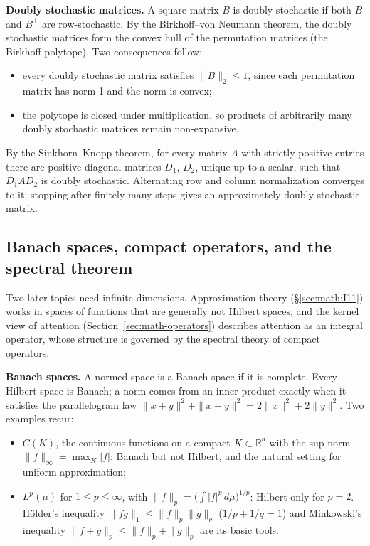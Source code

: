 \textbf{Doubly stochastic matrices.} A square matrix \(B\) is doubly
stochastic if both \(B\) and \(B^{\top}\) are row-stochastic. By the
Birkhoff--von Neumann theorem, the doubly stochastic matrices form the
convex hull of the permutation matrices (the Birkhoff polytope). Two
consequences follow:

\begin{itemize}
\tightlist
\item
  every doubly stochastic matrix satisfies \(\|B\|_{2} \le 1\), since each
  permutation matrix has norm 1 and the norm is convex;
\item
  the polytope is closed under multiplication, so products of
  arbitrarily many doubly stochastic matrices remain non-expansive.
\end{itemize}

By the Sinkhorn--Knopp theorem, for every matrix \(A\) with strictly
positive entries there are positive diagonal matrices \(D_{1}\),
\(D_{2}\), unique up to a scalar, such that \(D_{1}AD_{2}\) is
doubly stochastic. Alternating row and column normalization converges to
it; stopping after finitely many steps gives an approximately doubly
stochastic matrix.

\subsection{Banach spaces, compact operators, and the spectral
theorem}\label{sec:math:I4}

Two later topics need infinite dimensions. Approximation theory (\S\ref{sec:math:I11})
works in spaces of functions that are generally not Hilbert spaces, and
the kernel view of attention (Section~\ref{sec:math-operators}) describes attention as an
integral operator, whose structure is governed by the spectral theory of
compact operators.

\textbf{Banach spaces.} A normed space is a Banach space if it is
complete. Every Hilbert space is Banach; a norm comes from an inner
product exactly when it satisfies the parallelogram law
\(\|x + y\|^{2} + \|x - y\|^{2} = 2\|x\|^{2} + 2\|y\|^{2}\). Two examples recur:

\begin{itemize}
\tightlist
\item
  \(C(K)\), the continuous functions on a compact \(K \subset \mathbb{R}^{d}\)
  with the sup norm \(\|f\|_\infty = \max_{K} |f|\): Banach but
  not Hilbert, and the natural setting for uniform approximation;
\item
  \(L^p(\mu)\) for \(1 \le p \le \infty\), with
  \(\|f\|_p = \bigl(\int |f|^p \, d\mu\bigr)^{1/p}\): Hilbert only for \(p = 2\).
  Hölder's inequality \(\|fg\|_{1} \le \|f\|_p\|g\|_q\) (\(1/p + 1/q = 1\))
  and Minkowski's inequality \(\|f + g\|_p \le \|f\|_p + \|g\|_p\) are its basic tools.
\end{itemize}

